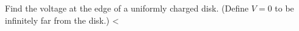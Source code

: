        Find the voltage at the edge of a uniformly charged
        disk. (Define $V=0$ to be infinitely far from the disk.)
        \answercheck<%
